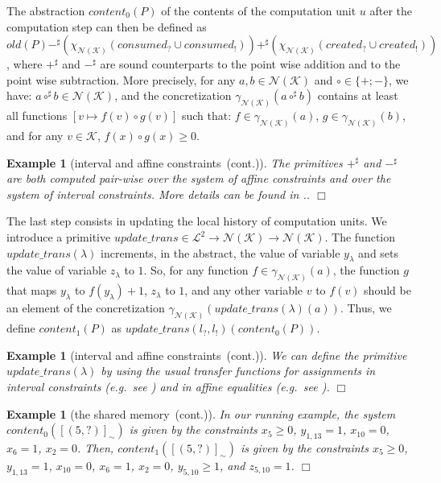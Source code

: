\documentclass{article}
\newcommand{\boxexample}{$\Box$}
\newtheorem{example}[thm]{Example}
\newcommand{\Labels}{\mathcal{L}}
\newcommand{\rec}{?}
\newcommand{\eme}{!}
\newcommand{\memlaba}{1}
\newcommand{\memlabb}{2}
\newcommand{\memlabe}{5}
\newcommand{\memlabf}{6}
\newcommand{\memlabj}{10}
\newcommand{\memlabm}{13}
\newcommand{\lrec}{l_{\rec}}
\newcommand{\leme}{l_{\eme}}
\newcommand{\continued}{(cont.)}
\newcommand{\shareanalysis}{the shared memory}
\newcommand{\var}{\mathcal{K}}
\newcommand{\abstnum}{\mathcal{N}(\var)}
\newcommand{\gammanum}{\gamma_{\abstnum}}
\newcommand{\xinum}{\chi_{\abstnum}}
\newcommand{\addnum}{+^{\sharp}}
\newcommand{\minnum}{-^{\sharp}}
\newcommand{\countdom}{interval and affine constraints}
\newcommand{\ccount}{\countdom\ \continued}
\newcommand{\ccontentanalysis}{\shareanalysis\ \continued}
\begin{document}
The abstraction $\textit{content}_0(P)$ of the contents of the computation unit $u$ after the computation step can then be defined as $\textit{old}(P) \minnum (\xinum(\textit{consumed}_\rec \cup \textit{consumed}_{\eme})) \addnum  (\xinum(\textit{created}_\rec \cup \textit{created}_{\eme}))$, where $\addnum$ and $\minnum$ are sound counterparts to the point wise addition and to the point wise subtraction. More precisely, for any $a,b\in\abstnum$ and $\circ\in\{+;-\}$, we have: 
$a\circ^{\sharp} b\in \abstnum$, and the concretization $\gammanum(a\circ^{\sharp} b)$ contains at least all functions $[v\mapsto f(v)\circ g(v)]$ such that: $f\in\gammanum(a)$, $g\in\gammanum(b)$, and for any $v\in\var$, $f(x)\circ g(x)\geq 0$. 

\begin{example}[\ccount]
\hspace*{-1mm}The primitives $+^{\sharp}$ and  $-^{\sharp}$ are both computed pair-wise over the system of affine constraints and over the system of interval constraints. More details can be found in \cite[Chap.~9,\;Sect.~9.3.1]{feret:thesis}..
\boxexample\end{example}

The last step consists in updating the local history of computation units. 
We introduce a primitive $\textit{update\_trans}\in\Labels^2 \rightarrow \abstnum \rightarrow \abstnum$. The function $\textit{update\_trans}(\lambda)$ increments, in the abstract, the value of variable $y_{\lambda}$ and sets the value of variable $z_{\lambda}$ to $1$. So, for any function $f\in\gammanum(a)$, the function $g$ that maps $y_\lambda$ to $f(y_\lambda)+1$, $z_\lambda$ to $1$, and any other variable $v$ to $f(v)$ should be an element of the concretization $\gammanum(\textit{update\_trans}(\lambda)(a))$. Thus, we define $\textit{content}_1(P)$ as $\textit{update\_trans}(\lrec,\leme)(\textit{content}_0(P))$. 

\begin{example}[\ccount]
We can define the primitive $\textit{update\_trans}(\lambda)$ by using the usual transfer functions for assignments in interval constraints (e.g.~see \cite{cc76}) and in affine equalities (e.g.~see \cite{karr}).
\boxexample\end{example}

\begin{example}[\ccontentanalysis]
In our running example, the system 
$\textit{content}_0([(\memlabe,\rec)]_\sim)$ is given by the constraints $x_{\memlabe}\geq 0$, $y_{\memlaba,\memlabm}=1$,  $x_{\memlabj}=0$, 
$x_{\memlabf}=1$, $x_{\memlabb}=0$.  
Then, $\textit{content}_1([(\memlabe,\rec)]_\sim)$ is given by the constraints 
$x_{\memlabe}\geq 0$, $y_{\memlaba,\memlabm}=1$,  $x_{\memlabj}=0$, 
$x_{\memlabf}=1$, $x_{\memlabb}=0$, $y_{\memlabe,\memlabj}\geq 1$, and $z_{\memlabe,\memlabj}=1$.
\boxexample\end{example}
\end{document}
